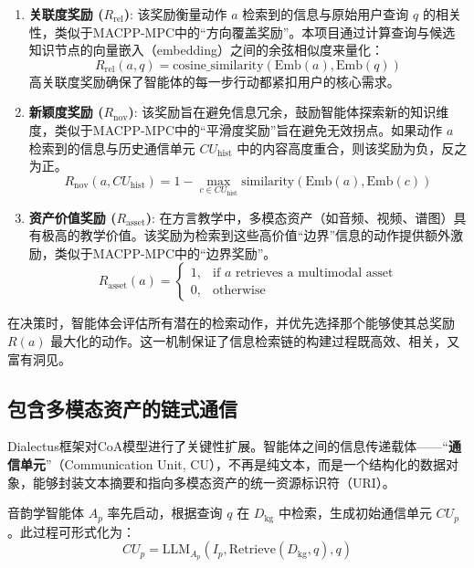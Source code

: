 \begin{enumerate}
    \item \textbf{关联度奖励 ($R_{\text{rel}}$)}: 该奖励衡量动作 $a$ 检索到的信息与原始用户查询 $q$ 的相关性，类似于MACPP-MPC中的“方向覆盖奖励”。本项目通过计算查询与候选知识节点的向量嵌入（embedding）之间的余弦相似度来量化：
    \begin{equation}
    R_{\text{rel}}(a, q) = \text{cosine\_similarity}(\text{Emb}(a), \text{Emb}(q))
    \end{equation}
    高关联度奖励确保了智能体的每一步行动都紧扣用户的核心需求。

    \item \textbf{新颖度奖励 ($R_{\text{nov}}$)}: 该奖励旨在避免信息冗余，鼓励智能体探索新的知识维度，类似于MACPP-MPC中的“平滑度奖励”旨在避免无效拐点。如果动作 $a$ 检索到的信息与历史通信单元 $CU_{\text{hist}}$ 中的内容高度重合，则该奖励为负，反之为正。
    \begin{equation}
    R_{\text{nov}}(a, CU_{\text{hist}}) = 1 - \max_{c \in CU_{\text{hist}}} \text{similarity}(\text{Emb}(a), \text{Emb}(c))
    \end{equation}

    \item \textbf{资产价值奖励 ($R_{\text{asset}}$)}: 在方言教学中，多模态资产（如音频、视频、谱图）具有极高的教学价值。该奖励为检索到这些高价值“边界”信息的动作提供额外激励，类似于MACPP-MPC中的“边界奖励”。
    \begin{equation}
    R_{\text{asset}}(a) = 
    \begin{cases} 
    1, & \text{if } a \text{ retrieves a multimodal asset} \\
    0, & \text{otherwise}
    \end{cases}
    \end{equation}
\end{enumerate}
在决策时，智能体会评估所有潜在的检索动作，并优先选择那个能够使其总奖励 $R(a)$ 最大化的动作。这一机制保证了信息检索链的构建过程既高效、相关，又富有洞见。

\subsection{包含多模态资产的链式通信}
Dialectus框架对CoA模型进行了关键性扩展。智能体之间的信息传递载体——“\textbf{通信单元}”（Communication Unit, CU），不再是纯文本，而是一个结构化的数据对象，能够封装文本摘要和指向多模态资产的统一资源标识符（URI）。

音韵学智能体 $A_p$ 率先启动，根据查询 $q$ 在 $D_{\text{kg}}$ 中检索，生成初始通信单元 $CU_p$。此过程可形式化为：
\begin{equation}
    CU_p = \text{LLM}_{A_p} (I_p, \text{Retrieve}(D_{\text{kg}}, q), q)
    \label{eq:cu_p}
\end{equation}

